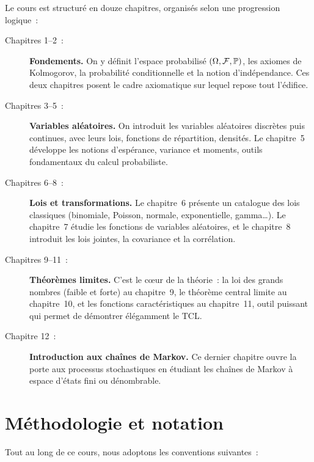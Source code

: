 Le cours est structur\'e en douze chapitres, organis\'es selon une progression logique~:

\begin{description}
    \item[Chapitres 1--2~:] \textbf{Fondements.} On y d\'efinit l'espace probabilis\'e
    $(\Omega, \mathcal{F}, \mathbb{P})$, les axiomes de Kolmogorov, la probabilit\'e conditionnelle
    et la notion d'ind\'ependance. Ces deux chapitres posent le cadre axiomatique sur lequel
    repose tout l'\'edifice.

    \item[Chapitres 3--5~:] \textbf{Variables al\'eatoires.} On introduit les variables
    al\'eatoires discr\`etes puis continues, avec leurs lois, fonctions de r\'epartition,
    densit\'es. Le chapitre~5 d\'eveloppe les notions d'esp\'erance, variance et moments,
    outils fondamentaux du calcul probabiliste.

    \item[Chapitres 6--8~:] \textbf{Lois et transformations.} Le chapitre~6 pr\'esente un
    catalogue des lois classiques (binomiale, Poisson, normale, exponentielle, gamma\ldots).
    Le chapitre~7 \'etudie les fonctions de variables al\'eatoires, et le chapitre~8
    introduit les lois jointes, la covariance et la corr\'elation.

    \item[Chapitres 9--11~:] \textbf{Th\'eor\`emes limites.} C'est le c\oe ur de la
    th\'eorie~: la loi des grands nombres (faible et forte) au chapitre~9, le th\'eor\`eme
    central limite au chapitre~10, et les fonctions caract\'eristiques au chapitre~11,
    outil puissant qui permet de d\'emontrer \'el\'egamment le TCL.

    \item[Chapitre 12~:] \textbf{Introduction aux cha\^ines de Markov.} Ce dernier
    chapitre ouvre la porte aux processus stochastiques en \'etudiant les cha\^ines de
    Markov \`a espace d'\'etats fini ou d\'enombrable.
\end{description}

\section*{M\'ethodologie et notation}

Tout au long de ce cours, nous adoptons les conventions suivantes~:

